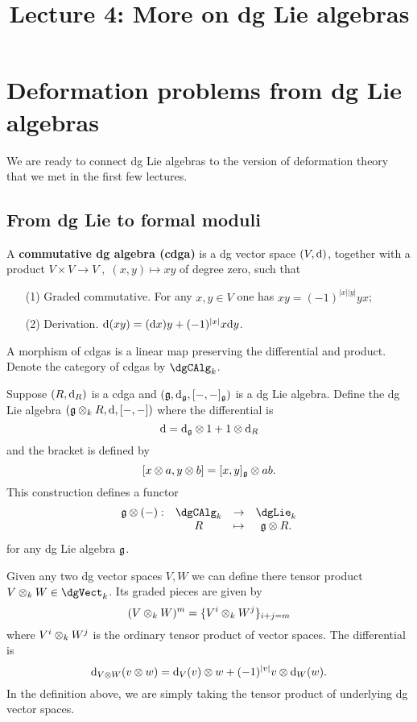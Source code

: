 \documentclass[11pt]{amsart}
\title{Lecture 4: More on dg Lie algebras}
\begin{document}
\section{Deformation problems from dg Lie algebras}

We are ready to connect dg Lie algebras to the version of deformation theory that we met in the first few lectures. 

\subsection{From dg Lie to formal moduli}

\begin{dfn}
A {\bf commutative dg algebra (cdga)} is a dg vector space $(V,{\rm d})$, together with a product $V \times V \to V \;,\; (x,y) \mapsto xy$ of degree zero, such that 
\begin{enumerate}
\item[(1)] Graded commutative. 
For any $x,y \in V$ one has $xy = (-1)^{|x||y|} y x$;
\item[(2)] Derivation. ${\rm d} (xy) = ({\rm d} x) y + (-1)^{|x|} x {\rm d} y$.
\end{enumerate}
A morphism of cdgas is a linear map preserving the differential and product. 
Denote the category of cdgas by $\dgCAlg_k$.
\end{dfn}

\begin{dfn} Suppose $(R,{\rm d}_R)$ is a cdga and $(\mathfrak g,{\rm d}_{\mathfrak g}, [-,-]_\mathfrak g)$ is a dg Lie algebra. 
Define the dg Lie algebra $(\mathfrak g \otimes_k R, {\rm d}, [-,-])$ where the differential is 
\[
{\rm d} = {\rm d}_\mathfrak g \otimes 1 + 1 \otimes {\rm d}_{R}
\]
and the bracket is defined by
\[
[x \otimes a, y \otimes b] = [x,y]_\mathfrak g \otimes ab .
\] 
This construction defines a functor
\[
\begin{array}{cccc}
\fg \tensor (-) : & \dgCAlg_k & \to & \dgLie_k \\
& R & \mapsto & \fg \tensor R .
\end{array}
\]
for any dg Lie algebra $\mathfrak g$. 
\end{dfn}

\begin{rmk}
Given any two dg vector spaces $V, W$ we can define there tensor product $V \tensor_k W \in \dgVect_k$. 
Its graded pieces are given by
\[
(V \otimes_k W)^m = \{V^i \otimes_k W^j\}_{i+j = m}
\]
where $V^i \otimes_k W^j$ is the ordinary tensor product of vector spaces.
The differential is
\[
{\rm d}_{V \otimes W} (v \otimes w) = {\rm d}_V(v) \otimes w + (-1)^{|v|} v \otimes {\rm d}_W (w) .
\]
In the definition above, we are simply taking the tensor product of underlying dg vector spaces. 
\end{rmk}
\end{document}
